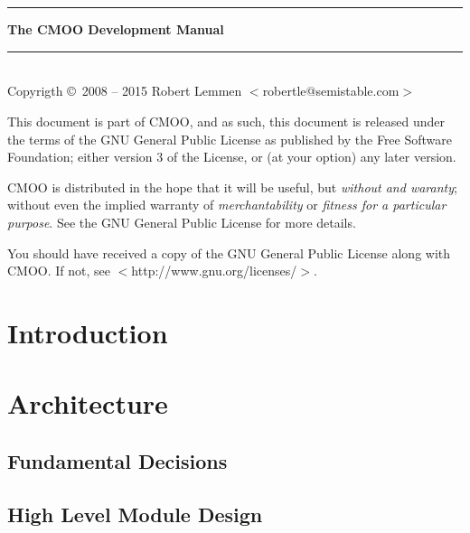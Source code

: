 \documentclass[12pt,a4paper]{article}
\begin{document}
\thispagestyle{empty}
~\\~\vspace{3cm}
\begin{center}
\rule{\textwidth}{1pt}\vspace{4mm}
{\Huge\bf The CMOO Development Manual}
\rule{\textwidth}{1pt}
\end{center}
\clearpage

\layout
\clearpage

\thispagestyle{empty}
~\\
Copyrigth \copyright~2008 -- 2015 Robert Lemmen $<$robertle@semistable.com$>$

This document is part of CMOO, and as such, this document is released under the terms of the GNU General Public License as published by the Free Software Foundation; either version 3 of the License, or (at your option) any later version.

CMOO is distributed in the hope that it will be useful, but {\em without and
waranty}; without even the implied warranty of {\em merchantability} or {\em
fitness for a particular purpose}.  See the GNU General Public License for more details.

You should have received a copy of the GNU General Public License along with
CMOO. If not, see $<$http://www.gnu.org/licenses/$>$.
\cleardoublepage

\tableofcontents
\cleardoublepage

\cleardoublepage

\section{Introduction}\label{sec:introduction}


\section{Architecture}\label{sec:architecture}

\subsection{Fundamental Decisions}\label{sec:fundamental_decisions}


\subsection{High Level Module Design}\label{sec:hl_design}
\end{document}

